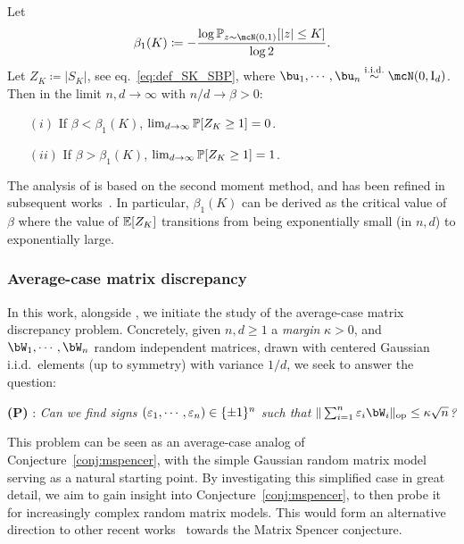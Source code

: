 \begin{theorem}\label{thm:trans_SBP}
    Let 
    \begin{equation*}
        \beta_1(K) \coloneqq - \frac{\log \bbP_{z \sim \mcN(0,1)}[|z| \leq K]}{\log 2}.
    \end{equation*}
    Let $Z_K \coloneqq |S_K|$, see eq.~\eqref{eq:def_SK_SBP}, 
    where $\bu_1, \cdots, \bu_n \iid \mcN(0, \Id_d)$.
    Then in the limit $n, d \to \infty$ with $n / d \to \beta > 0$:
    \begin{itemize}
        \item[$(i)$] If $\beta < \beta_1(K)$, $\lim_{d \to \infty} \mathbb{P}[Z_K \geq 1] = 0$. 
        \item[$(ii)$] If $\beta > \beta_1(K)$, $\lim_{d \to \infty} \mathbb{P}[Z_K \geq 1] = 1$. 
    \end{itemize}
\end{theorem} 
\noindent
The analysis of \cite{aubin2019storage} is based on the second moment method, and has been refined in subsequent works~\citep{abbe2022proof,gamarnik2022algorithms}. In particular, 
$\beta_1(K)$ can be derived as the critical value of $\beta$ where the value of $\mathbb{E}[Z_K]$ 
transitions from being exponentially small (in $n,d$) to exponentially large.


\subsubsection{Average-case matrix discrepancy}\label{subsubsec:average_mdiscrepancy}

In this work, 
alongside \cite{kunisky2023online},
we initiate the study of the average-case matrix discrepancy problem.
Concretely, given $n, d \geq 1$ a \emph{margin} $\kappa > 0$, and $\bW_1, \cdots, \bW_n$ random independent matrices, drawn with centered Gaussian i.i.d.\ elements (up to symmetry) with variance $1/d$, we seek to answer the question: 
\begin{center}
   \textrm{\textbf{(P)}} : \textit{Can we find signs $(\varepsilon_1, \cdots, \varepsilon_n) \in \{\pm 1\}^n$ such that $\|\sum_{i=1}^n \eps_i \bW_i\|_\op \leq \kappa \sqrt{n}$?}
\end{center}
\noindent 
This problem can be seen as an average-case analog of Conjecture~\ref{conj:mspencer}, with the simple Gaussian random matrix model serving as a natural starting point.
By investigating this simplified case in great detail, we aim to gain insight into Conjecture~\ref{conj:mspencer},
to then probe it for increasingly complex random matrix models. This would form an alternative direction to other recent works~\citep{hopkins2022matrix,dadush2022new,bansal2023resolving} towards the Matrix Spencer conjecture.

